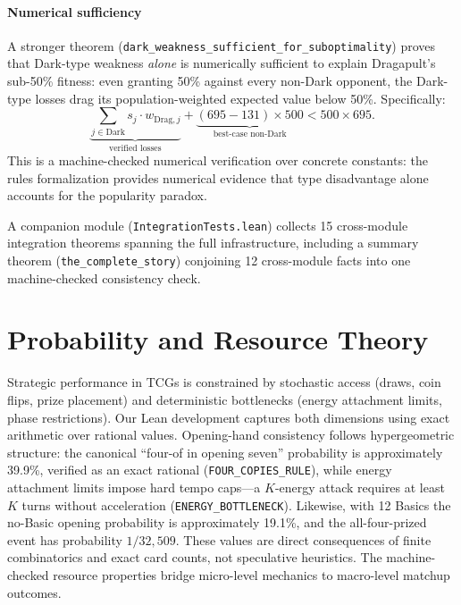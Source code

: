 \documentclass[journal]{IEEEtran}
\let\origsection\section
\renewcommand{\section}{\needspace{4\baselineskip}\origsection}
\begin{document}
\paragraph{Numerical sufficiency}
A stronger theorem (\texttt{dark\_weakness\_sufficient\_for\_sub\-optimality}) proves that Dark-type weakness \emph{alone} is numerically sufficient to explain Dragapult's sub-50\% fitness: even granting 50\% against every non-Dark opponent, the Dark-type losses drag its population-weighted expected value below 50\%.
Specifically:
\[
  \underbrace{\sum_{j \in \text{Dark}} s_j \cdot w_{\text{Drag},j}}_{\text{verified losses}} + \underbrace{(695 - 131) \times 500}_{\text{best-case non-Dark}} < 500 \times 695.
\]
This is a machine-checked numerical verification over concrete constants: the rules formalization provides numerical evidence that type disadvantage alone accounts for the popularity paradox.

A companion module (\texttt{IntegrationTests.lean}) collects 15 cross-module integration theorems spanning the full infrastructure, including a summary theorem (\texttt{the\_complete\_story}) conjoining 12 cross-module facts into one machine-checked consistency check.

\section{Probability and Resource Theory}\label{sec:probability}

Strategic performance in TCGs is constrained by stochastic access (draws, coin flips, prize placement) and deterministic bottlenecks (energy attachment limits, phase restrictions).
Our Lean development captures both dimensions using exact arithmetic over rational values.
Opening-hand consistency follows hypergeometric structure: the canonical ``four-of in opening seven'' probability is approximately 39.9\%, verified as an exact rational (\texttt{FOUR\_COPIES\_RULE}), while energy attachment limits impose hard tempo caps---a $K$-energy attack requires at least $K$ turns without acceleration (\texttt{ENERGY\_BOTTLENECK}).
Likewise, with 12 Basics the no-Basic opening probability is approximately 19.1\%, and the all-four-prized event has probability $1/32{,}509$.
These values are direct consequences of finite combinatorics and exact card counts, not speculative heuristics.
The machine-checked resource properties bridge micro-level mechanics to macro-level matchup outcomes.
\end{document}
